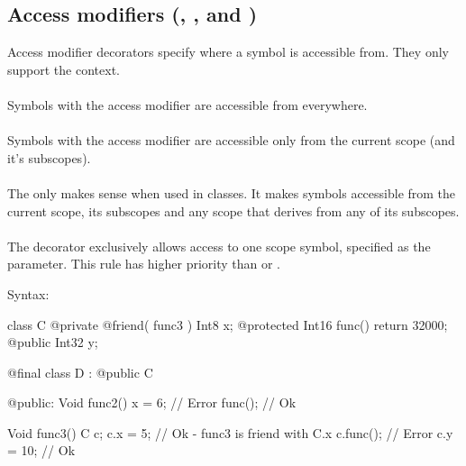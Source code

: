 \subsection{Access modifiers (, ,  and )} \label{accessModifierDecorators}
Access modifier decorators specify where a symbol is accessible from. They only support the  context.

\paragraph{} \label{decorator:public} Symbols with the  access modifier are accessible from everywhere.

\paragraph{} \label{decorator:private} Symbols with the  access modifier are accessible only from the current scope (and it's subscopes).

\paragraph{} \label{decorator:protected} The  only makes sense when used in classes. It makes symbols accessible from the current scope, its subscopes and any scope that derives from any of its subscopes.

\paragraph{} \label{decorator:friend} The  decorator exclusively allows access to one scope symbol, specified as the parameter. This rule has higher priority than  or .

Syntax: 

\begin{code}
class C {
	@private @friend( func3 ) Int8 x;
	@protected Int16 func() {
		return 32000;
	}	
	@public Int32 y;
}

@final class D : @public C {
	
@public:
	Void func2() {
		x = 6; // Error
		func(); // Ok
	}
	
}

Void func3() {
	C c;
	c.x = 5; // Ok - func3 is friend with C.x
	c.func(); // Error
	c.y = 10; // Ok
}
\end{code}

